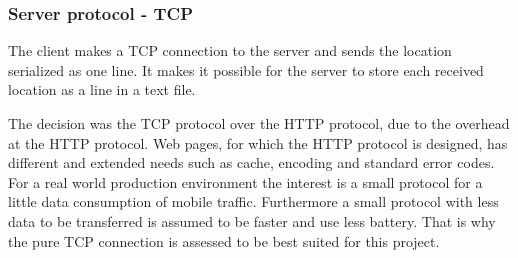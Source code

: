 \subsubsection{Server protocol - TCP}
The client makes a TCP connection to the server and sends the location serialized as one line. It makes it possible for the server to store each received location as a line in a text file.

The decision was the TCP protocol over the HTTP protocol, due to the overhead at the HTTP protocol. Web pages, for which the HTTP protocol is designed, has different and extended needs such as cache, encoding and standard error codes. For a real world production environment the interest is a small protocol for a little data consumption of mobile traffic. Furthermore a small protocol with less data to be transferred is assumed to be faster and use less battery. That is why the pure TCP connection is assessed to be best suited for this project.